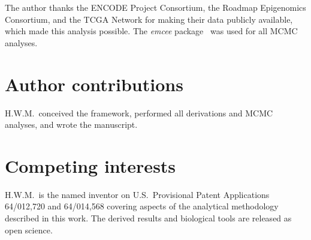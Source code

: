 \documentclass[12pt,a4paper]{article}
\begin{document}
The author thanks the ENCODE Project Consortium, the Roadmap Epigenomics
Consortium, and the TCGA Network for making their data publicly available,
which made this analysis possible. The \textit{emcee} package~\cite{ForemanMackey2013}
was used for all MCMC analyses.

\section*{Author contributions}

H.W.M.\ conceived the framework, performed all derivations and MCMC analyses,
and wrote the manuscript.

\section*{Competing interests}

H.W.M.\ is the named inventor on U.S.\ Provisional Patent Applications
64/012,720 and 64/014,568 covering aspects of the analytical methodology
described in this work. The derived results and biological tools are
released as open science.

\end{document}
